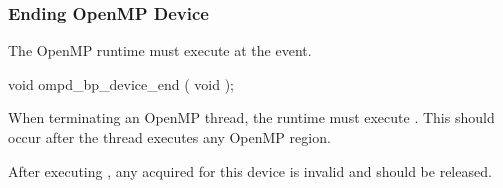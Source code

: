 %
%

\subsubsection{Ending OpenMP Device}
\label{subsubsec:ompd_bp_device_end}

\summary
The OpenMP runtime must execute 
 at the  event.


\begin{cspecific}
\begin{ompSyntax}
void ompd_bp_device_end ( void );
\end{ompSyntax}
\end{cspecific}


\descr

When terminating an OpenMP thread, the runtime must 
execute .
This should occur after the thread executes any OpenMP region.

After 
executing , any  acquired for this
device is invalid and should be released.

%
%


